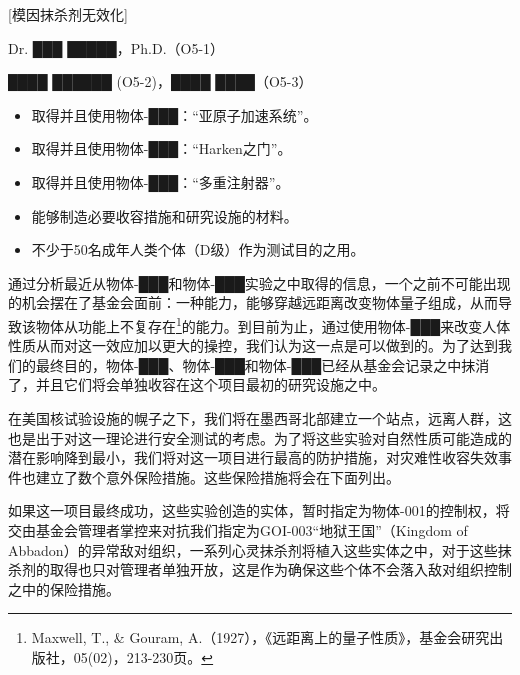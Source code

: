 


\begin{scpboxc}
{[模因抹杀剂无效化]}
\end{scpboxc}

\begin{scpboxbbwm}






Dr. ███ █████，Ph.D.（O5-1）

████ ██████ (O5-2)，████ ████（O5-3）


\begin{itemize}
	\item 取得并且使用物体-███：“亚原子加速系统”。
	\item 取得并且使用物体-███：“Harken之门”。
	\item 取得并且使用物体-███：“多重注射器”。
	\item 能够制造必要收容措施和研究设施的材料。
	\item 不少于50名成年人类个体（D级）作为测试目的之用。
\end{itemize}
	

通过分析最近从物体-███和物体-███实验之中取得的信息，一个之前不可能出现的机会摆在了基金会面前：一种能力，能够穿越远距离改变物体量子组成，从而导致该物体从功能上不复存在\footnote{Maxwell, T., \& Gouram, A.（1927），《远距离上的量子性质》，基金会研究出版社，05(02)，213-230页。}的能力。到目前为止，通过使用物体-███来改变人体性质从而对这一效应加以更大的操控，我们认为这一点是可以做到的。为了达到我们的最终目的，物体-███、物体-███和物体-███已经从基金会记录之中抹消了，并且它们将会单独收容在这个项目最初的研究设施之中。

在美国核试验设施的幌子之下，我们将在墨西哥北部建立一个站点，远离人群，这也是出于对这一理论进行安全测试的考虑。为了将这些实验对自然性质可能造成的潜在影响降到最小，我们将对这一项目进行最高的防护措施，对灾难性收容失效事件也建立了数个意外保险措施。这些保险措施将会在下面列出。

如果这一项目最终成功，这些实验创造的实体，暂时指定为物体-001的控制权，将交由基金会管理者掌控来对抗我们指定为GOI-003“地狱王国”（Kingdom of Abbadon）的异常敌对组织，一系列心灵抹杀剂将植入这些实体之中，对于这些抹杀剂的取得也只对管理者单独开放，这是作为确保这些个体不会落入敌对组织控制之中的保险措施。

\end{scpboxbbwm}

